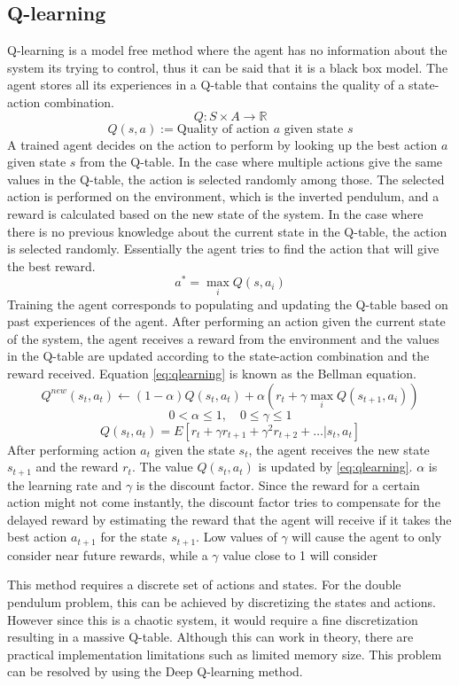 \documentclass{LTHtwocol} %
\begin{document}
\subsection{Q-learning}
Q-learning is a model free method where the agent has no information about the system its trying to control, thus it can be said that it is a black box model.
The agent stores all its experiences in a Q-table that contains the quality of a state-action combination.
\[ Q : S \times A  \to \mathbb{R} \]
\[Q(s,a) := \text{Quality of action $a$ given state  $s$} \]
A trained agent decides on the action to perform by looking up the best action $a$ given state $s$ from the Q-table.
In the case where multiple actions give the same values in the Q-table, the action is selected randomly among those.
The selected action is performed on the environment, which is the inverted pendulum, and a reward is calculated based on the new state of the system.
In the case where there is no previous knowledge about the current state in the Q-table, the action is selected randomly.
Essentially the agent tries to find the action that will give the best reward.
\[ a^* = \max_i Q(s,a_i) \]
Training the agent corresponds to populating and updating the Q-table based on past experiences of the agent.
After performing an action given the current state of the system, the agent receives a reward from the environment and the values in the Q-table are updated according to the state-action combination and the reward received.
Equation \eqref{eq:qlearning} is known as the Bellman equation.
\begin{equation}
Q^{new}(s_t,a_t) \leftarrow (1 - \alpha)Q(s_t,a_t) + \alpha (r_t + \gamma \max_i Q(s_{t+1},a_i ))
\label{eq:qlearning}
\end{equation}
\[ 0 < \alpha \leq 1, \quad 0 \leq \gamma \leq 1  \]
\[ Q(s_t,a_t) = E[r_t + \gamma r_{t+1} + \gamma^2 r_{t+2} + \hdots | s_t,a_t] \]
After performing action $a_t$ given the state $s_t$, the agent receives the new state $s_{t+1}$ and the reward $r_t$. The value $Q(s_t,a_t)$ is updated by \eqref{eq:qlearning}. $\alpha$ is the learning rate and $\gamma$ is the discount factor. Since the reward for a certain action might not come instantly, the discount factor tries to compensate for the delayed reward by estimating the reward that the agent will receive if it takes the best action $a_{t+1}$ for the state $s_{t+1}$. Low values of $\gamma$ will cause the agent to only consider near future rewards, while a $\gamma$ value close to 1 will consider

This method requires a discrete set of actions and states. For the double pendulum problem, this can be achieved by discretizing the states and actions.
However since this is a chaotic system, it would require a fine discretization resulting in a massive Q-table. Although this can work in theory, there are practical implementation limitations such as limited memory size.
This problem can be resolved by using the Deep Q-learning method.
\end{document}
